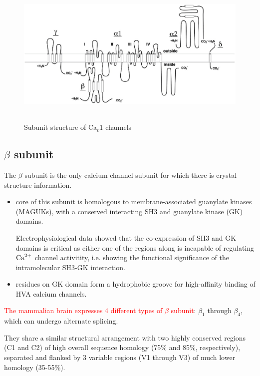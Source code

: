 \begin{figure}[htb]
  \centerline{\includegraphics[height=7cm]{./images/Ca_subunit_structure.eps}}
  \caption{Subunit structure of Ca$_v1$ channels}\label{fig:ca_subunit}
\end{figure}

\subsection[beta subunit]{$\beta$ subunit}
\label{sec:beta-subunit-VDCC}

The $\beta$ subunit is the only calcium channel subunit for
which there is crystal structure information.
\begin{itemize}
  \item core of this subunit is homologous to membrane-associated guanylate
  kinases (MAGUKs), with a conserved interacting SH3 and guanylate kinase (GK)
  domains.
  
  Electrophysiological data showed that the co-expression of SH3 and GK domains
  is critical as either one of the regions along is incapable of regulating
  ${\text{Ca}^{2+}}$ channel activitity, i.e. showing the functional significance of the
  intramolecular SH3-GK interaction.
  
  
  \item residues on GK domain form a hydrophobic groove for high-affinity
  binding of HVA calcium channels.
\end{itemize}

\textcolor{red}{The mammalian brain expresses 4 different types of $\beta$
subunit}: $\beta_1$ through $\beta_4$, which can undergo alternate splicing.

They share a similar structural arrangement with two highly conserved regions
(C1 and C2) of high overall sequence homology (75\% and 85\%, respectively),
separated and flanked by 3 variable regions (V1 through V3) of much lower
homology (35-55\%).

